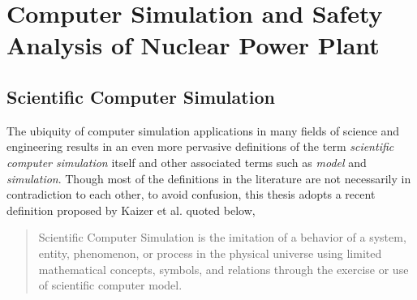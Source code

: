 \newpage
\section{Computer Simulation and Safety Analysis of Nuclear Power Plant}\label{sec:intro_computer_simulation}

\subsection{Scientific Computer Simulation}\label{sub:intro_scientific_computer_simulation}

The ubiquity of computer simulation applications in many fields of science and engineering results in an even more pervasive definitions of the term \textit{scientific computer simulation} itself and other associated terms such as \textit{model} and \textit{simulation}.
Though most of the definitions in the literature are not necessarily in contradiction to each other, 
to avoid confusion, this thesis adopts a recent definition proposed by Kaizer et al.\cite{Kaizer2015} quoted below,
\begin{quote}
	Scientific Computer Simulation is the imitation of a behavior of a system, entity, phenomenon, or process in the physical universe 
	using limited mathematical concepts, symbols, and relations through the exercise or use of scientific computer model.
\end{quote}

